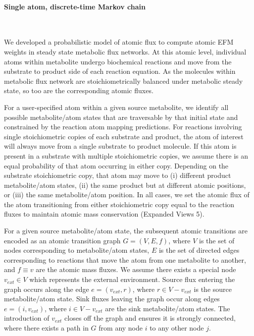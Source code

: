\documentclass[12pt]{article}
\begin{document}

\paragraph*{Single atom, discrete-time Markov chain}

\hspace*{0.1cm}\\\noindent

We developed a probabilistic model of atomic flux to compute atomic EFM
weights in steady state metabolic flux networks. At this atomic level,
individual atoms within metabolite undergo biochemical reactions and move
from the substrate to product side of each reaction equation. As the
molecules within metabolic flux network are stoichiometrically balanced
under metabolic steady state, so too are the corresponding atomic fluxes.

For a user-specified atom within a given source metabolite, we identify
all possible metabolite/atom states that are traversable by that initial
state and constrained by the reaction atom mapping predictions. For
reactions involving single stoichiometric copies of each substrate and
product, the atom of interest will always move from a single substrate to
product molecule. If this atom is present in a substrate with multiple
stoichiometric copies, we assume there is an equal probability of that
atom occurring in either copy. Depending on the substrate stoichiometric
copy, that atom may move to (i) different product metabolite/atom states,
(ii) the same product but at different atomic positions, or (iii) the same
metabolite/atom position. In all cases, we set the atomic flux of the atom
transitioning from either stoichiometric copy equal to the reaction fluxes
to maintain atomic mass conservation (Expanded Views 5).

For a given source metabolite/atom state, the subsequent atomic
transitions are encoded as an atomic transition graph $G = (V, E, f)$,
where $V$ is the set of nodes corresponding to
metabolite/atom states, $E$ is the set of directed edges corresponding to
reactions that move the atom from one metabolite to another, and $f \equiv
v$ are the atomic mass fluxes. We assume there exists a special node $v_{ext} \in V$
which represents the external environment. Source flux entering the graph
occurs along the edge $e = (v_{ext}, r)$, where $r \in V - v_{ext}$ is the
source metabolite/atom state. Sink fluxes leaving the graph occur along
edges $e = (i, v_{ext})$, where $i \in V - v_{ext}$ are the sink
metabolite/atom states. The introduction of $v_{ext}$ closes off the graph
and ensures it is strongly connected, where there exists a path in $G$
from any node $i$ to any other node $j$.
\end{document}
